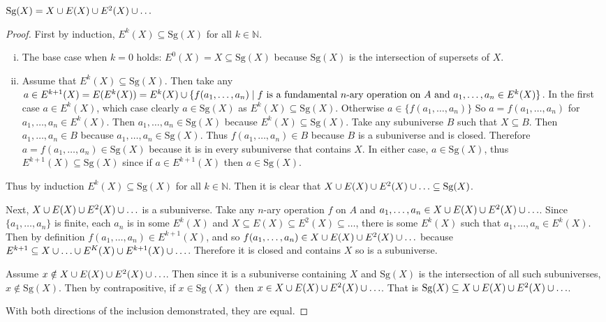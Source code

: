 \begin{theorem*}
  $\text{Sg}(X) = X \cup E(X) \cup E^2(X) \cup \ldots$
\end{theorem*}

\begin{proof}
  First by induction, $E^k(X) \subseteq \text{Sg}(X)$ for all $k \in \mathbb{N}$.
  \begin{enumerate}[(i)]
    \item The base case when $k =0$ holds: $E^0(X) = X \subseteq \text{Sg}(X)$ because $\text{Sg}(X)$ is the intersection of supersets of $X$.
    \item Assume that $E^{k}(X) \subseteq \text{Sg}(X)$.
          Then take any $a \in E^{k+1}(X) = E(E^k(X)) = E^k(X) \cup \{ f(a_1, \ldots, a_n) \mid f \text{ is a fundamental $n$-ary operation on $A$ and } a_1,\ldots, a_n \in E^k(X)\}$.
          In the first case $a \in E^k(X)$, which case clearly $a\in\text{Sg}(X)$ as $E^{k}(X) \subseteq \text{Sg}(X)$.
          Otherwise $a \in \{ f(a_1, \ldots, a_n) \}$
	  So $a = f(a_1, \ldots, a_n)$ for $a_1, \ldots, a_n \in E^k(X)$.
          Then $a_1, \ldots, a_n \in \text{Sg}(X)$ because $E^k(X) \subseteq \text{Sg}(X)$.
          Take any subuniverse $B$ such that $X\subseteq B$.
          Then $a_1, \ldots, a_n \in B$ because $a_1, \ldots, a_n \in \text{Sg}(X)$.
          Thus $f(a_1, \ldots, a_n) \in B$ because $B$ is a subuniverse and is closed.
          Therefore $a = f(a_1, \ldots, a_n) \in \text{Sg}(X)$ because it is in every subuniverse that contains $X$.
          In either case, $a \in \text{Sg}(X)$, thus $E^{k+1}(X) \subseteq \text{Sg}(X)$ since if $a \in E^{k+1}(X)$ then $a\in\text{Sg}(X)$.
  \end{enumerate}
  Thus by induction $E^{k}(X) \subseteq \text{Sg}(X)$ for all $k \in \mathbb{N}$.
  Then it is clear that $X \cup E(X) \cup E^2(X) \cup \ldots \subseteq \text{Sg}(X)$.

  Next, $X\cup E(X) \cup E^2(X) \cup \ldots$ is a subuniverse.
  Take any $n$-ary operation $f$ on $A$ and $a_1, \ldots, a_n \in X\cup E(X) \cup E^2(X) \cup \ldots$.
  Since $\{a_1, \ldots, a_n \}$ is finite, each $a_n$ is in some $E^k(X)$ and $X \subseteq E(X) \subseteq E^2(X) \subseteq \ldots$, there is some $E^k(X)$ such that $a_1, \ldots, a_n \in E^k(X)$.
  Then by definition $f(a_1, \ldots, a_n) \in E^{k+1}(X)$, and so $f(a_1, \ldots, a_n) \in X\cup E(X) \cup E^2(X) \cup \ldots$ because $E^{k+1} \subseteq X \cup \ldots \cup E^K(X) \cup E^{k+1}(X) \cup \ldots$.
  Therefore it is closed and contains $X$ so is a subuniverse.

  Assume $x\notin X\cup E(X) \cup E^2(X)\cup\ldots$.
  Then since it is a subuniverse containing $X$ and $\text{Sg}(X)$ is the intersection of all such subuniverses, $x\notin \text{Sg}(X)$.
  Then by contrapositive, if $x\in \text{Sg}(X)$ then $x \in X\cup E(X) \cup E^2(X) \cup \ldots$.
  That is $\text{Sg}(X) \subseteq  X\cup E(X) \cup E^2(X) \cup \ldots$.

  With both directions of the inclusion demonstrated, they are equal.
\end{proof}
